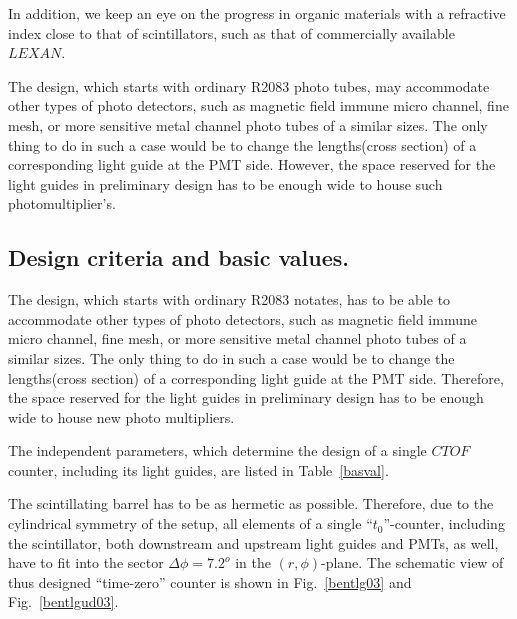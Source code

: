 In addition, we keep an eye  on  the progress in  organic  materials  
with a refractive index close to that of scintillators, 
such as that of commercially available  $LEXAN$.   

The  design, which starts with  ordinary R2083 photo tubes,
 may  accommodate other  types of  
photo detectors,  such as  magnetic field immune micro channel, 
fine mesh, or  more  sensitive 
metal channel photo tubes of a similar sizes.
The only thing to do in such a case would be to change the lengths(cross section)
of a corresponding  light guide  at the PMT side.
 However, the space reserved for the light guides in preliminary design 
 has to be enough wide to house such photomultiplier's. 
  



\subsection{Design criteria and basic values.}
\label{sbasval}

The  design, which starts with  ordinary R2083 notates,
 has to be able to   accommodate other  types of  
photo detectors,  such as  magnetic field immune micro channel, 
fine mesh, or  more  sensitive 
metal channel photo tubes of a similar sizes.
The only thing to do in such a case would be to change the lengths(cross section)
of a corresponding  light guide  at the PMT side.
 Therefore, the space reserved for the light guides in preliminary design 
 has to be enough wide to house new  photo multipliers. 
  



The  independent  parameters,  which   determine the design
of a single $CTOF$ counter,  including  its light guides, are listed
 in Table~\ref{basval}.

The scintillating barrel has to be as hermetic as possible. 
Therefore, due to the cylindrical  symmetry of the setup,
all elements of a single  ``$t_0$''-counter, including the scintillator, 
both downstream and upstream  light guides and PMTs, as well,
have to fit into the sector $\Delta \phi=7.2^o$ in the  $(r,\phi)$-plane.
The  schematic view of thus  designed   ``time-zero'' counter 
is shown in Fig.~\ref{bentlg03} 
and Fig.~\ref{bentlgud03}.

